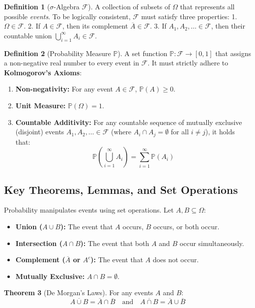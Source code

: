 \documentclass[11pt, letterpaper]{article}
\theoremstyle{definition}
\newtheorem{theorem}{Theorem}[section]
\newtheorem{definition}[theorem]{Definition}
\theoremstyle{remark}
\newcommand{\F}{\mathcal{F}}
\newcommand{\Prob}{\mathbb{P}}
\newcommand{\comp}[1]{\overline{#1}}
\begin{document}
\begin{definition}[$\sigma$-Algebra $\F$]
    A collection of subsets of $\Omega$ that represents all possible \textit{events}. To be logically consistent, $\F$ must satisfy three properties:
    1. $\Omega \in \F$.
    2. If $A \in \F$, then its complement $\comp{A} \in \F$.
    3. If $A_1, A_2, \dots \in \F$, then their countable union $\bigcup_{i=1}^\infty A_i \in \F$.
\end{definition}

\begin{definition}[Probability Measure $\Prob$]
    A set function $\Prob: \F \to [0,1]$ that assigns a non-negative real number to every event in $\F$. It must strictly adhere to \textbf{Kolmogorov's Axioms}:
    \begin{enumerate}
        \item \textbf{Non-negativity:} For any event $A \in \F$, $\Prob(A) \geq 0$.
        \item \textbf{Unit Measure:} $\Prob(\Omega) = 1$.
        \item \textbf{Countable Additivity:} For any countable sequence of mutually exclusive (disjoint) events $A_1, A_2, \dots \in \F$ (where $A_i \cap A_j = \emptyset$ for all $i \neq j$), it holds that:
        \[ \Prob\left(\bigcup_{i=1}^\infty A_i\right) = \sum_{i=1}^\infty \Prob(A_i) \]
    \end{enumerate}
\end{definition}

\subsection{Key Theorems, Lemmas, and Set Operations}
Probability manipulates events using set operations. Let $A, B \subseteq \Omega$:
\begin{itemize}
    \item \textbf{Union ($A \cup B$):} The event that $A$ occurs, $B$ occurs, or both occur.
    \item \textbf{Intersection ($A \cap B$):} The event that both $A$ and $B$ occur simultaneously.
    \item \textbf{Complement ($\comp{A}$ or $A^c$):} The event that $A$ does not occur.
    \item \textbf{Mutually Exclusive:} $A \cap B = \emptyset$.
\end{itemize}

\begin{theorem}[De Morgan's Laws]
    For any events $A$ and $B$:
    \[ \overline{A \cup B} = \comp{A} \cap \comp{B} \quad \text{and} \quad \overline{A \cap B} = \comp{A} \cup \comp{B} \]
\end{theorem}
\end{document}
